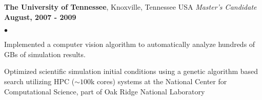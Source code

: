 \documentclass[margin,line, 11pt]{res}
\newenvironment{list2}{
  \begin{list}{$\bullet$}{%
      \setlength{\itemsep}{0in}
      \setlength{\parsep}{0in} \setlength{\parskip}{0in}
      \setlength{\topsep}{0in} \setlength{\partopsep}{0in}
      \setlength{\leftmargin}{0.2in}}}{\end{list}}
\begin{document}
\begin{resume}
\textbf{The University of Tennessee}, Knoxville, Tennessee USA\newline
\textit{Master's Candidate} \hfill \textbf{August, 2007 - 2009}\newline
    \begin{list2}
    	\vspace*{-5mm}
      \item Implemented a computer vision algorithm to automatically analyze hundreds of GBs of simulation results.
      \item Optimized scientific simulation initial conditions using a genetic algorithm based search utilizing HPC ($\sim100$k cores) systems at the National Center for Computational Science, part of Oak Ridge National Laboratory
    \end{list2}
\vspace*{-3mm}

\end{resume}
\end{document}
